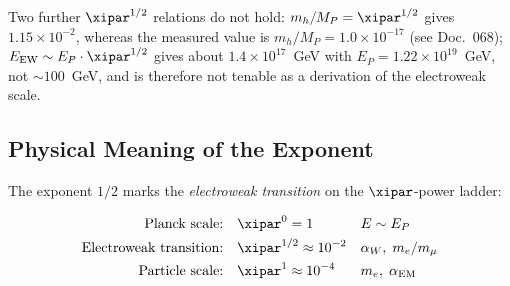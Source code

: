 \begin{table}[H]
    \centering
    \caption{The exponent $\xipar^{1/2} = 0.011547$ as the universal
    electroweak exponent in T0 theory. It marks the geometric transition
    from the Planck world to the particle-physics scale.}
    \label{tab:xi12}
\end{table}

Two further $\xipar^{1/2}$ relations do not hold: $m_h/M_P = \xipar^{1/2}$ gives
$1.15\times10^{-2}$, whereas the measured value is $m_h/M_P = 1.0\times10^{-17}$ (see
Doc.~068); $E_\mathrm{EW} \sim E_P\cdot\xipar^{1/2}$ gives about $1.4\times10^{17}$~GeV
with $E_P = 1.22\times10^{19}$~GeV, not $\sim 100$~GeV, and is therefore not tenable as
a derivation of the electroweak scale.

\subsection{Physical Meaning of the Exponent}

The exponent $1/2$ marks the \emph{electroweak transition} on the
$\xipar$-power ladder:

\begin{align}
    \text{Planck scale:}\quad          & \xipar^0     = 1
        && E \sim E_P \notag \\
    \text{Electroweak transition:}\quad & \xipar^{1/2} \approx 10^{-2}
        && \alpha_W,\; m_e/m_\mu
        \label{eq:rung} \\
    \text{Particle scale:}\quad        & \xipar^1     \approx 10^{-4}
        && m_e,\; \alpha_\mathrm{EM} \notag
\end{align}

